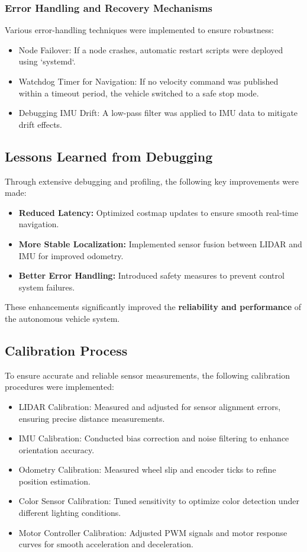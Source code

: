 \documentclass[english,project]{buwthesis}
\begin{document}
\subsubsection{Error Handling and Recovery Mechanisms}
Various error-handling techniques were implemented to ensure robustness:
\begin{itemize}
    \item Node Failover: If a node crashes, automatic restart scripts were deployed using `systemd`.
    \item Watchdog Timer for Navigation: If no velocity command was published within a timeout period, the vehicle switched to a safe stop mode.
    \item Debugging IMU Drift: A low-pass filter was applied to IMU data to mitigate drift effects.
\end{itemize}

\subsection{Lessons Learned from Debugging}
Through extensive debugging and profiling, the following key improvements were made:
\begin{itemize}
    \item \textbf{Reduced Latency:} Optimized costmap updates to ensure smooth real-time navigation.
    \item \textbf{More Stable Localization:} Implemented sensor fusion between LIDAR and IMU for improved odometry.
    \item \textbf{Better Error Handling:} Introduced safety measures to prevent control system failures.
\end{itemize}

These enhancements significantly improved the \textbf{reliability and performance} of the autonomous vehicle system.

\subsection{Calibration Process}
To ensure accurate and reliable sensor measurements, the following calibration procedures were implemented:
\begin{itemize}
    \item LIDAR Calibration: Measured and adjusted for sensor alignment errors, ensuring precise distance measurements.
    \item IMU Calibration: Conducted bias correction and noise filtering to enhance orientation accuracy.
    \item Odometry Calibration: Measured wheel slip and encoder ticks to refine position estimation.
    \item Color Sensor Calibration: Tuned sensitivity to optimize color detection under different lighting conditions.
    \item Motor Controller Calibration: Adjusted PWM signals and motor response curves for smooth acceleration and deceleration.
\end{itemize}
\end{document}
